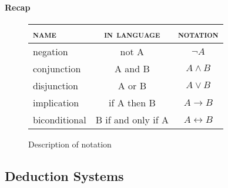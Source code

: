 \paragraph{Recap}

\begin{figure}[H]
  \centering
  \begin{tabular}{lcc}
    \textsc{name} & \textsc{in language} & \textsc{notation} \\\hline
    negation & not A & $\lnot A$ \\ \hline
    conjunction & A and B & $A \land B$ \\ \hline
    disjunction & A or B & $A \lor B$ \\ \hline
    implication & if A then B & $A \to B$ \\ \hline
    biconditional & B if and only if A & $A \leftrightarrow B$ \\ \hline

  \end{tabular}
  \caption{Description of notation}
  \label{fig:propositional}
\end{figure}





\subsection{Deduction Systems}

%




